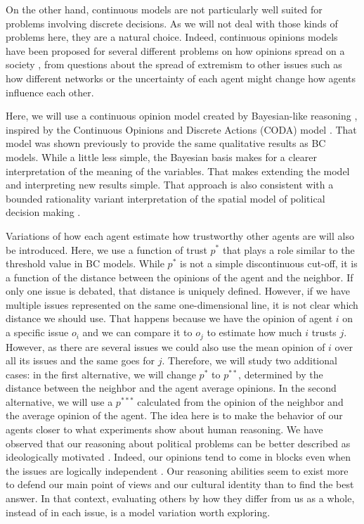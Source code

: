 \documentclass{article}
\begin{document}
On the other hand, continuous models are not particularly well suited for
problems involving discrete decisions. As we will not deal with those kinds of
problems here, they are a natural choice. Indeed, continuous opinions models
have been proposed for several different problems on how opinions spread on a
society \cite{deffuantetal02a,weisbuchetal05}, from questions about the spread
of extremism
\cite{amblarddeffuant04,gargiulomazzoni08a,franksetal08a,alizadeh14a,Albi2016}
to other issues such as how different networks
\cite{Kurmyshev2011,Acemoglu2011,Das2014,Hu2017} or the uncertainty of each
agent \cite{deffuant06} might change how agents influence each other.

Here, we will use a continuous opinion model created by Bayesian-like reasoning
\cite{martins08c}, inspired by the Continuous Opinions and Discrete Actions
(CODA) model \cite{martins08a,martins12b}. That model was shown previously
\cite{martins08c} to provide the same qualitative results as BC models. While a
little less simple, the Bayesian basis makes for a clearer interpretation of the
meaning of the variables. That makes extending the model and interpreting new
results simple. That approach is also consistent with a bounded rationality
variant interpretation of the spatial model of political decision making
\cite{humphreys2010spatial,ostrom1998behavioral}.

Variations of how each agent estimate how trustworthy other agents are will also
be introduced. Here, we use a function of trust $p^*$ that plays a role similar
to the threshold value in BC models. While $p^*$ is not a simple discontinuous
cut-off, it is a function of the distance between the opinions of the agent and
the neighbor. If only one issue is debated, that distance is uniquely defined.
However, if we have multiple issues represented on the same one-dimensional
line, it is not clear which distance we should use. That happens because we have
the opinion of agent $i$ on a specific issue $o_i$ and we can compare it to
$o_j$ to estimate how much $i$ trusts $j$. However, as there are several issues
we could also use the mean opinion of $i$ over all its issues and the same goes
for $j$. Therefore, we will study two additional cases: in the first
alternative, we will change \(p^*\) to \(p^{**}\), determined by the distance
between the neighbor and the agent average opinions. In the second alternative,
we will use a \(p^{***}\) calculated from the opinion of the neighbor and the
average opinion of the agent. The idea here is to make the behavior of our
agents closer to what experiments show about human reasoning. We have observed
that our reasoning about political problems can be better described as
ideologically motivated \cite{jostetal03a,taberlodge06a,Claassen2015a}. Indeed,
our opinions tend to come in blocks even when the issues are logically
independent \cite{jervis76a}. Our reasoning abilities seem to exist more to
defend our main point of views \cite{mercier11a,merciersperber11a} and our
cultural identity \cite{kahanetal11} than to find the best answer. In that
context, evaluating others by how they differ from us as a whole, instead of in
each issue, is a model variation worth exploring.
\end{document}
